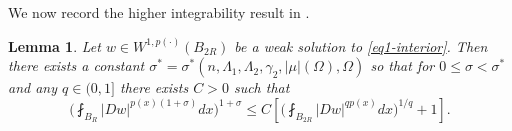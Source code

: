 \documentclass[a4paper,10pt]{amsart}
\newtheorem{lem}[thm]{Lemma}
\newtheorem{rem}[thm]{Remark}
\newcommand{\f}{\frac}
\newcommand{\om}{\omega}
\newcommand{\Om}{\Omega}
\begin{document}
	
We now record the higher integrability result in \cite[Theorem 5]{AM2}.
\begin{lem}
	\label{lem1-higherIntegrability} Let $w\in W^{1,p(\cdot)}(B_{2R})$ be a weak solution to \eqref{eq1-interior}. Then there exists a constant $\sigma^*=\sigma^*(n,\Lambda_1, \Lambda_2, \gamma_2, |\mu|(\Om), \Om)$ so that for $0\leq \sigma<\sigma^*$ and any $q\in (0,1]$ there exists $C>0$ such that
\begin{equation}\label{eq-higherinte}
	\Big(\fint_{B_R}|Dw|^{p(x)(1+\sigma)}dx\Big)^{1+\sigma}\leq C\left[\Big(\fint_{B_{2R}}|Dw|^{qp(x)}dx\Big)^{1/q}+1\right].
	\end{equation}
\end{lem}
\end{document}
